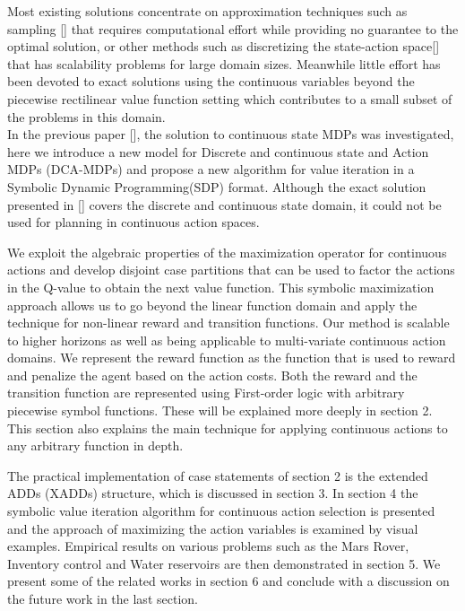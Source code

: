 \documentclass[letterpaper]{article}
\begin{document}
Most existing solutions concentrate on approximation techniques such as sampling [] that requires computational effort while providing no guarantee to the optimal solution, or other methods such as discretizing the state-action space[] that has scalability problems for large domain sizes. Meanwhile little effort has been devoted to exact solutions using the continuous variables beyond the piecewise rectilinear value function setting which contributes to a small subset of the problems in this domain. \\
In the previous paper [], the solution to continuous state MDPs was investigated, here we introduce a new model for Discrete and continuous state and Action MDPs (DCA-MDPs) and propose a new algorithm for value iteration in a Symbolic Dynamic Programming(SDP) format. Although the exact solution presented in [] covers the discrete and continuous state domain, it could not be used for planning in continuous action spaces. 

We exploit the algebraic properties of the maximization operator for continuous actions and develop disjoint case partitions that can be used to factor the actions in the Q-value to obtain the next value function. This symbolic maximization approach allows us to go beyond the linear function domain and apply the technique for non-linear reward and transition functions. Our method is scalable to higher horizons as well as being applicable to multi-variate continuous action domains. We represent the reward function as the function that is used to reward and penalize the agent based on the action costs. Both the reward and the transition function are represented using First-order logic with arbitrary piecewise symbol functions. These will be explained more deeply in section 2. This section also explains the main technique for applying continuous actions to any arbitrary function in depth. 

The practical implementation of case statements of section 2 is the extended ADDs (XADDs) structure, which is discussed in section 3. In section 4 the symbolic value iteration algorithm for continuous action selection is presented and the approach of maximizing the action variables is examined by visual examples. Empirical results on various problems such as the Mars Rover, Inventory control and Water reservoirs are then demonstrated in section 5. We present some of the related works in section 6 and conclude with a discussion on the future work in the last section. 
\end{document}
